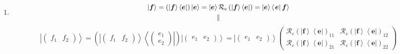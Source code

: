 \documentclass[aps,preprint]{revtex4}
\begin{document}
\begin{enumerate}
\item 
\begin{gather}
\left\vert \boldsymbol{f}\right\rangle =\left( \left\vert \boldsymbol{f}%
\right\rangle \left\langle \boldsymbol{e}\right\vert \right) \left\vert 
\boldsymbol{e}\right\rangle =\left\vert \boldsymbol{e}\right\rangle \mathcal{%
R}_{e}\left( \left\vert \boldsymbol{f}\right\rangle \left\langle \boldsymbol{%
e}\right\vert \right) =\left\vert \boldsymbol{e}\right\rangle \left\langle
\left. \boldsymbol{e}\right\vert \boldsymbol{f}\right\rangle \\
\parallel
\end{gather}%
\begin{equation*}
\left\vert \left( 
\begin{array}{cc}
f_{1} & f_{2}%
\end{array}%
\right) \right\rangle =\left( \left\vert \left( 
\begin{array}{cc}
f_{1} & f_{2}%
\end{array}%
\right) \right\rangle \left\langle \left( 
\begin{array}{c}
e_{1} \\ 
e_{2}%
\end{array}%
\right) \right\vert \right) \left\vert \left( 
\begin{array}{cc}
e_{1} & e_{2}%
\end{array}%
\right) \right\rangle =\left\vert \left( 
\begin{array}{cc}
e_{1} & e_{2}%
\end{array}%
\right) \right\rangle \left( 
\begin{array}{cc}
\mathcal{R}_{e}\left( \left\vert \boldsymbol{f}\right\rangle \left\langle 
\boldsymbol{e}\right\vert \right) _{11} & \mathcal{R}_{e}\left( \left\vert 
\boldsymbol{f}\right\rangle \left\langle \boldsymbol{e}\right\vert \right)
_{12} \\ 
\mathcal{R}_{e}\left( \left\vert \boldsymbol{f}\right\rangle \left\langle 
\boldsymbol{e}\right\vert \right) _{21} & \mathcal{R}_{e}\left( \left\vert 
\boldsymbol{f}\right\rangle \left\langle \boldsymbol{e}\right\vert \right)
_{22}%
\end{array}%
\right)
\end{equation*}


\end{enumerate}
\end{document}
